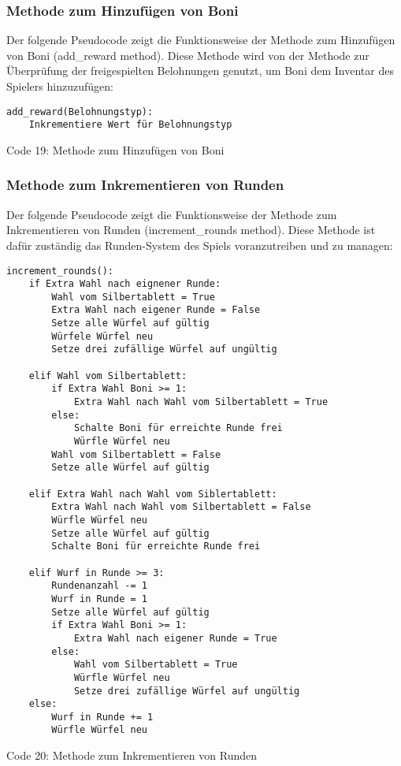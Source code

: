 \subsubsection{Methode zum Hinzufügen von Boni}
\begin{minipage}{\linewidth}
Der folgende Pseudocode zeigt die Funktionsweise der Methode zum Hinzufügen von Boni (add\_reward method). Diese Methode wird von der Methode zur Überprüfung der freigespielten Belohnungen genutzt, um Boni dem Inventar des Spielers hinzuzufügen:
\vspace{0.5cm}
\begin{lstlisting}
add_reward(Belohnungstyp):
	Inkrementiere Wert für Belohnungstyp
\end{lstlisting}
Code 19: Methode zum Hinzufügen von Boni\\
\end{minipage}

\subsubsection{Methode zum Inkrementieren von Runden}
Der folgende Pseudocode zeigt die Funktionsweise der Methode zum Inkrementieren von Runden (increment\_rounds method). Diese Methode ist dafür zuständig das Runden-System des Spiels voranzutreiben und zu managen:
\vspace{0.5cm}
\begin{lstlisting}
increment_rounds():
	if Extra Wahl nach eignener Runde:
		Wahl vom Silbertablett = True
		Extra Wahl nach eigener Runde = False
		Setze alle Würfel auf gültig
		Würfele Würfel neu
		Setze drei zufällige Würfel auf ungültig
		
	elif Wahl vom Silbertablett:
		if Extra Wahl Boni >= 1:
			Extra Wahl nach Wahl vom Silbertablett = True
		else:
			Schalte Boni für erreichte Runde frei
			Würfle Würfel neu
		Wahl vom Silbertablett = False
		Setze alle Würfel auf gültig
	
	elif Extra Wahl nach Wahl vom Siblertablett:
		Extra Wahl nach Wahl vom Silbertablett = False
		Würfle Würfel neu
		Setze alle Würfel auf gültig
		Schalte Boni für erreichte Runde frei
	
	elif Wurf in Runde >= 3:
		Rundenanzahl -= 1
		Wurf in Runde = 1
		Setze alle Würfel auf gültig
		if Extra Wahl Boni >= 1:
			Extra Wahl nach eigener Runde = True
		else:
			Wahl vom Silbertablett = True
			Würfle Würfel neu
			Setze drei zufällige Würfel auf ungültig
	else:
		Wurf in Runde += 1
		Würfle Würfel neu
\end{lstlisting}
Code 20: Methode zum Inkrementieren von Runden\\

